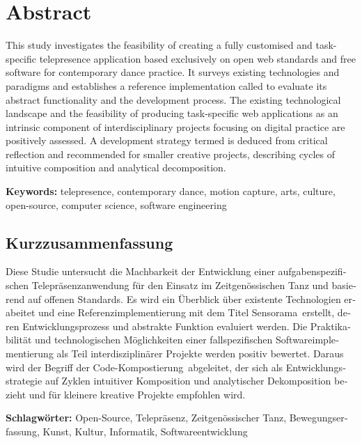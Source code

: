 \section*{Abstract}

This study investigates the feasibility of creating a fully customised and task-specific telepresence application based exclusively on open web standards and free software for contemporary dance practice.
It surveys existing technologies and paradigms and establishes a reference implementation called  to evaluate its abstract functionality and the development process.
The existing technological landscape and the feasibility of producing task-specific web applications as an intrinsic component of interdisciplinary projects focusing on digital practice are positively assessed.
A development strategy termed  is deduced from critical reflection and recommended for smaller creative projects, describing cycles of intuitive composition and analytical decomposition.

\textbf{Keywords:} telepresence, contemporary dance, motion capture, arts, culture, open-source, computer science, software engineering


\begin{otherlanguage}{ngerman}
\section*{Kurzzusammenfassung}
Diese Studie untersucht die Machbarkeit der Entwicklung einer aufgabenspezifischen Telepräsenzanwendung für den Einsatz im Zeitgenössischen Tanz und basierend auf offenen Standards.
Es wird ein Überblick über existente Technologien erabeitet und eine Referenzimplementierung mit dem Titel \glqq Sensorama\grqq \ erstellt, deren Entwicklungsprozess und abstrakte Funktion evaluiert werden.
Die Praktikabilität und technologischen Möglichkeiten einer fallspezifischen Softwareimplementierung als Teil interdisziplinärer Projekte werden positiv bewertet.
Daraus wird der Begriff der \glqq Code-Kompostierung\grqq \ abgeleitet, der sich als Entwicklungsstrategie auf Zyklen intuitiver Komposition und analytischer Dekomposition bezieht und für kleinere kreative Projekte empfohlen wird.

\textbf{Schlagwörter:} Open-Source, Telepräsenz, Zeitgenössischer Tanz, Bewegungserfassung, Kunst, Kultur, Informatik, Softwareentwicklung
\end{otherlanguage}
